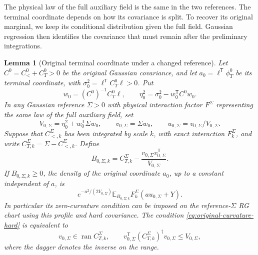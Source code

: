 \documentclass[11pt]{article}
\newtheorem{lemma}[theorem]{Lemma}
\theoremstyle{definition}
\newcommand{\E}{\mathbb E}
\begin{document}
The physical law of the full auxiliary field is the same in the
two references. The terminal coordinate depends on how its
covariance is split. To recover its original marginal, we keep
its conditional distribution given the full field. Gaussian
regression then identifies the covariance that must remain after
the preliminary integrations.

\begin{lemma}[Original terminal coordinate under a changed reference]
\label{lem:original-curvature-posterior}
Let \(C^0=C^0_<+C^0_T>0\) be the original Gaussian covariance,
and let \(a_0=\ell^{\mathsf T}\phi^0_T\) be its terminal
coordinate, with \(\sigma_0^2=\ell^{\mathsf T}C^0_T\ell>0\).
Put
\begin{equation}
 w_0=(C^0)^{-1}C^0_T\ell,\qquad
 \eta_0^2=\sigma_0^2-w_0^{\mathsf T}C^0w_0 .
\end{equation}
In any Gaussian reference \(\Sigma>0\) with physical interaction
factor \(F^\Sigma\) representing the same law of the full
auxiliary field, set
\begin{equation}
 V_{0,\Sigma}=\eta_0^2+w_0^{\mathsf T}\Sigma w_0,\qquad
 v_{0,\Sigma}=\Sigma w_0,\qquad
 u_{0,\Sigma}=v_{0,\Sigma}/V_{0,\Sigma}.
\end{equation}
Suppose that \(C^\Sigma_{<,k}\) has been integrated by scale
\(k\), with exact interaction \(F^\Sigma_k\), and write
\(C^\Sigma_{T,k}=\Sigma-C^\Sigma_{<,k}\). Define
\begin{equation}
 B_{0,\Sigma,k}=C^\Sigma_{T,k}
               -\frac{v_{0,\Sigma}v_{0,\Sigma}^{\mathsf T}}{V_{0,\Sigma}}.
 \label{eq:original-curvature-hard}
\end{equation}
If \(B_{0,\Sigma,k}\ge0\), the density of the original
coordinate \(a_0\), up to a constant independent of \(a\), is
\begin{equation}
  e^{-a^2/(2V_{0,\Sigma})}
       \E_{B_{0,\Sigma,k}}F^\Sigma_k(a u_{0,\Sigma}+Y).
 \label{eq:original-curvature-density}
\end{equation}
In particular its zero-curvature condition can be imposed on
the reference-\(\Sigma\) RG chart using this profile and hard
covariance. The condition \eqref{eq:original-curvature-hard}
is equivalent to
\begin{equation}
 v_{0,\Sigma}\in\operatorname{ran} C^\Sigma_{T,k},\qquad
 v_{0,\Sigma}^{\mathsf T}
 (C^\Sigma_{T,k})^\dagger v_{0,\Sigma}\le V_{0,\Sigma},
\end{equation}
where the dagger denotes the inverse on the range.
\end{lemma}
\end{document}

